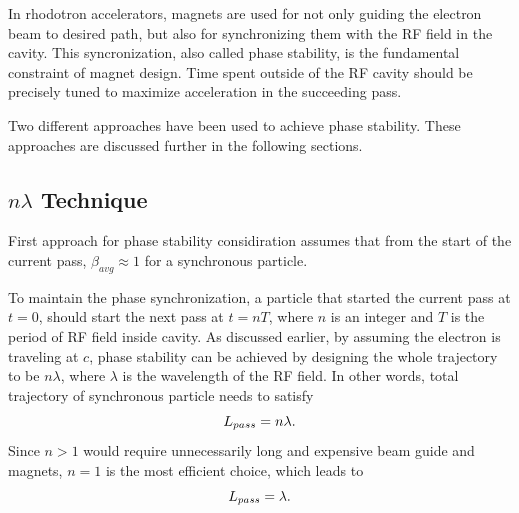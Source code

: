 \documentclass{article}
\begin{document}
In rhodotron accelerators, magnets are used for not only guiding the electron beam to desired path, but also for synchronizing them with the RF field in the cavity. 
This syncronization, also called phase stability, is the fundamental constraint of magnet design. 
Time spent outside of the RF cavity should be precisely tuned to maximize acceleration in the succeeding pass. 

Two different approaches have been used to achieve phase stability.
These approaches are discussed further in the following sections.

\subsection{$n\lambda$ Technique} \label{sec:n_L_technique}

First approach for phase stability considiration assumes that from the start of the current pass, $\beta_{avg} \approx 1$ for a synchronous particle. 

To maintain the phase synchronization, a particle that started the current pass at $t=0$, should start the next pass at $t=nT$, where $n$ is an integer and $T$ is the period of RF field inside cavity.
As discussed earlier, by assuming the electron is traveling at $c$, phase stability can be achieved by designing the whole trajectory to be $n \lambda$, where $\lambda$ is the wavelength of the RF field. 
In other words, total trajectory of synchronous particle needs to satisfy
\vspace{-10pt}\begin{equation}
    L_{pass} = n \lambda .
\vspace{-10pt}\end{equation} 
Since $n>1$ would require unnecessarily long and expensive beam guide and magnets, $n=1$ is the most efficient choice, which leads to
\vspace{-10pt}\begin{equation}
    L_{pass} = \lambda .
\vspace{-10pt}\end{equation} 
\end{document}
